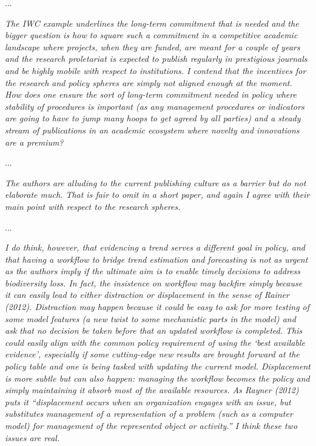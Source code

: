 \documentclass[11pt,letter]{article}
\begin{document}
...

\begin{mybox}
\emph{The IWC example underlines the long-term commitment that is needed and the bigger
question is how to square such a commitment in a competitive academic landscape where
projects, when they are funded, are meant for a couple of years and the research proletariat is
expected to publish regularly in prestigious journals and be highly mobile with respect to
institutions. I contend that the incentives for the research and policy spheres are simply not
aligned enough at the moment. How does one ensure the sort of long-term commitment
needed in policy where stability of procedures is important (as any management procedures or
indicators are going to have to jump many hoops to get agreed by all parties) and a steady
stream of publications in an academic ecosystem where novelty and innovations are a
premium?}  
\end{mybox}

...

\begin{mybox}
\emph{The authors are alluding to the current publishing culture as a barrier but do not elaborate
much. That is fair to omit in a short paper, and again I agree with their main point with respect to the research spheres.}
\end{mybox}

...

\begin{mybox}
\emph{I do think, however, that evidencing a trend serves a different goal in
policy, and that having a workflow to bridge trend estimation and forecasting is not as urgent
as the authors imply if the ultimate aim is to enable timely decisions to address biodiversity
loss. In fact, the insistence on workflow may backfire simply because it can easily lead to either
distraction or displacement in the sense of Rainer (2012). Distraction may happen because it
could be easy to ask for more testing of some model features (a new twist to some mechanistic
parts in the model) and ask that no decision be taken before that an updated workflow is
completed. This could easily align with the common policy requirement of using the ‘best
available evidence’, especially if some cutting-edge new results are brought forward at the
policy table and one is being tasked with updating the current model. Displacement is more
subtle but can also happen: managing the workflow becomes the policy and simply
maintaining it absorb most of the available resources. As Rayner (2012) puts it “displacement
occurs when an organization engages with an issue, but substitutes management of a
representation of a problem (such as a computer model) for management of the represented
object or activity.” I think these two issues are real.} 
\end{mybox}
\end{document}
